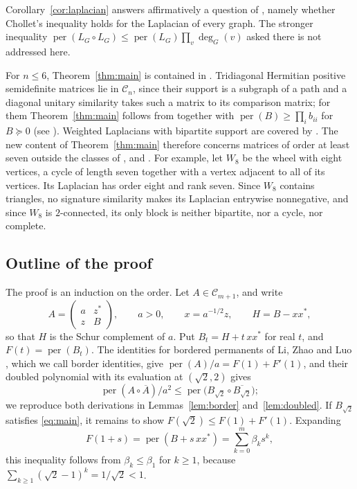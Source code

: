 \documentclass[11pt]{amsart}
\theoremstyle{remark}
\numberwithin{equation}{section}
\newcommand{\per}{\operatorname{per}}
\newcommand{\cC}{\mathcal{C}}
\newcommand{\conj}[1]{\overline{#1}}
\begin{document}
Corollary~\ref{cor:laplacian} answers affirmatively a question of \cite[Section~6]{PS}, namely whether Chollet's inequality holds for the Laplacian of every graph. The stronger inequality $\per(L_G\circ L_G)\le\per(L_G)\prod_v\deg_G(v)$ asked there is not addressed here.

For $n\le6$, Theorem~\ref{thm:main} is contained in \cite{LZL}. Tridiagonal Hermitian positive semidefinite matrices lie in $\cC_n$, since their support is a subgraph of a path and a diagonal unitary similarity takes such a matrix to its comparison matrix; for them Theorem~\ref{thm:main} follows from \cite[Corollary~3.2.3]{Bea} together with $\per(B)\ge\prod_ib_{ii}$ for $B\succeq0$ (see \cite[Corollary~1]{PS}). Weighted Laplacians with bipartite support are covered by \cite[Theorem~1]{PS}. The new content of Theorem~\ref{thm:main} therefore concerns matrices of order at least seven outside the classes of \cite{Bea}, \cite{PS} and \cite{Ma}. For example, let $W_8$ be the wheel with eight vertices, a cycle of length seven together with a vertex adjacent to all of its vertices. Its Laplacian has order eight and rank seven. Since $W_8$ contains triangles, no signature similarity makes its Laplacian entrywise nonnegative, and since $W_8$ is $2$-connected, its only block is neither bipartite, nor a cycle, nor complete.

\subsection{Outline of the proof}

The proof is an induction on the order. Let $A\in\cC_{m+1}$, and write
\[
A=\begin{pmatrix} a & z^*\\ z & B\end{pmatrix},\qquad a>0,\qquad x=a^{-1/2}z,\qquad H=B-xx^*,
\]
so that $H$ is the Schur complement of $a$. Put $B_t=H+t\,xx^*$ for real $t$, and $F(t)=\per(B_t)$. The identities for bordered permanents of Li, Zhao and Luo \cite[Proposition~3.2]{LZL}, which we call border identities, give $\per(A)/a=F(1)+F'(1)$, and their doubled polynomial with its evaluation at $(\sqrt2,2)$ \cite[Proposition~4.1]{LZL} gives
\[
\per(A\circ\conj{A})/a^2\le\per\bigl(B_{\sqrt2}\circ\conj{B_{\sqrt2}}\bigr);
\]
we reproduce both derivations in Lemmas~\ref{lem:border} and~\ref{lem:doubled}. If $B_{\sqrt2}$ satisfies \eqref{eq:main}, it remains to show $F(\sqrt2)\le F(1)+F'(1)$. Expanding
\[
F(1+s)=\per(B+s\,xx^*)=\sum_{k=0}^m\beta_ks^k,
\]
this inequality follows from $\beta_k\le\beta_1$ for $k\ge1$, because $\sum_{k\ge1}(\sqrt2-1)^k=1/\sqrt2<1$.
\end{document}
